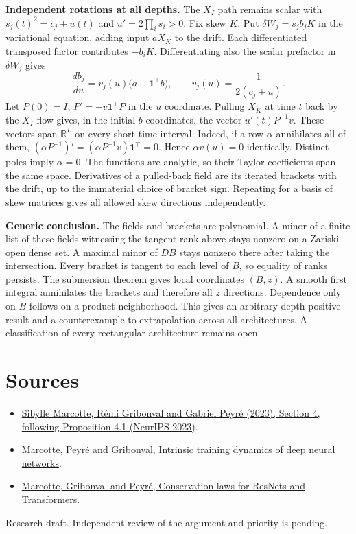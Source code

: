 \documentclass[10pt]{article}
\begin{document}
\textbf{Independent rotations at all depths.} The $X_I$ path remains scalar with $s_j(t)^2=c_j+u(t)$ and $u'=2\prod_i s_i>0$. Fix skew $K$. Put $\delta W_j=s_j b_j K$ in the variational equation, adding input $a X_K$ to the drift. Each differentiated transposed factor contributes $-b_iK$. Differentiating also the scalar prefactor in $\delta W_j$ gives
\[
 \frac{d b_j}{du}=v_j(u)\big(a-\mathbf 1^\top b\big),\qquad
 v_j(u)=\frac{1}{2(c_j+u)}.
\]
Let $P(0)=I$, $P'=-v\mathbf1^\top P$ in the $u$ coordinate. Pulling $X_K$ at time $t$ back by the $X_I$ flow gives, in the initial $b$ coordinates, the vector $u'(t)P^{-1}v$. These vectors span $\mathbb R^L$ on every short time interval. Indeed, if a row $\alpha$ annihilates all of them, $(\alpha P^{-1})'=(\alpha P^{-1}v)\mathbf1^\top=0$. Hence $\alpha v(u)=0$ identically. Distinct poles imply $\alpha=0$. The functions are analytic, so their Taylor coefficients span the same space. Derivatives of a pulled-back field are its iterated brackets with the drift, up to the immaterial choice of bracket sign. Repeating for a basis of skew matrices gives all allowed skew directions independently.

\textbf{Generic conclusion.} The fields and brackets are polynomial. A minor of a finite list of these fields witnessing the tangent rank above stays nonzero on a Zariski open dense set. A maximal minor of $DB$ stays nonzero there after taking the intersection. Every bracket is tangent to each level of $B$, so equality of ranks persists. The submersion theorem gives local coordinates $(B,z)$. A smooth first integral annihilates the brackets and therefore all $z$ directions. Dependence only on $B$ follows on a product neighborhood. This gives an arbitrary-depth positive result and a counterexample to extrapolation across all architectures. A classification of every rectangular architecture remains open.

\section*{Sources}
\begin{itemize}
\item \href{https://arxiv.org/abs/2307.00144}{Sibylle Marcotte, Rémi Gribonval and Gabriel Peyré (2023), Section 4, following Proposition 4.1 (NeurIPS 2023)}.
\item \href{https://arxiv.org/abs/2508.07370}{Marcotte, Peyré and Gribonval, Intrinsic training dynamics of deep neural networks}.
\item \href{https://proceedings.mlr.press/v267/marcotte25a.html}{Marcotte, Gribonval and Peyré, Conservation laws for ResNets and Transformers}.
\end{itemize}
{\small Research draft. Independent review of the argument and priority is pending.}
\end{document}
